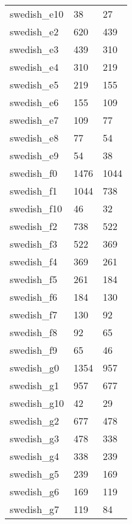 {\begin{supertabular}{|lll|}
               swedish\_e10 &     38 &     27 \\
                swedish\_e2 &    620 &    439 \\
                swedish\_e3 &    439 &    310 \\
                swedish\_e4 &    310 &    219 \\
                swedish\_e5 &    219 &    155 \\
                swedish\_e6 &    155 &    109 \\
                swedish\_e7 &    109 &     77 \\
                swedish\_e8 &     77 &     54 \\
                swedish\_e9 &     54 &     38 \\
                swedish\_f0 &   1476 &   1044 \\
                swedish\_f1 &   1044 &    738 \\
               swedish\_f10 &     46 &     32 \\
                swedish\_f2 &    738 &    522 \\
                swedish\_f3 &    522 &    369 \\ \shrinkheight{5mm}
                swedish\_f4 &    369 &    261 \\
                swedish\_f5 &    261 &    184 \\
                swedish\_f6 &    184 &    130 \\
                swedish\_f7 &    130 &     92 \\
                swedish\_f8 &     92 &     65 \\
                swedish\_f9 &     65 &     46 \\
                swedish\_g0 &   1354 &    957 \\
                swedish\_g1 &    957 &    677 \\
               swedish\_g10 &     42 &     29 \\
                swedish\_g2 &    677 &    478 \\
                swedish\_g3 &    478 &    338 \\
                swedish\_g4 &    338 &    239 \\
                swedish\_g5 &    239 &    169 \\
                swedish\_g6 &    169 &    119 \\
                swedish\_g7 &    119 &     84 \\

\end{supertabular}}
